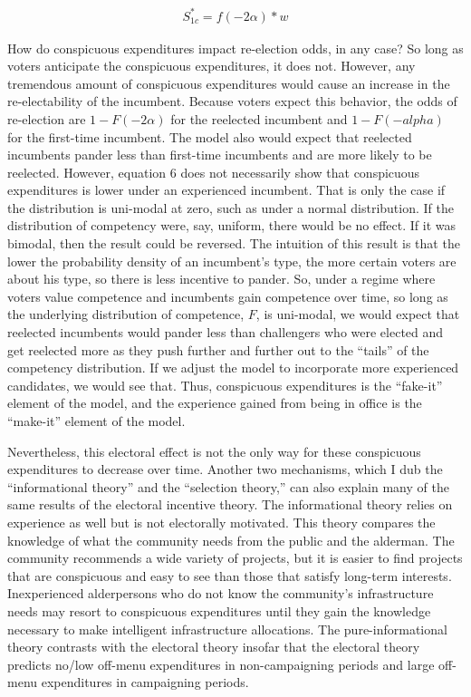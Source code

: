 \begin{align}
    S_{1c}^*=f(-2\alpha)*w
\end{align}

How do conspicuous expenditures impact re-election odds, in any case? So long as voters anticipate the conspicuous expenditures, it does not. 
However, any tremendous amount of conspicuous expenditures would cause an increase in the re-electability of the incumbent. 
Because voters expect this behavior, the odds of re-election are $1-F(-2 \alpha)$ for the reelected incumbent and $1-F(-alpha)$ for the first-time incumbent. 
The model also would expect that reelected incumbents pander less than first-time incumbents and are more likely to be reelected. 
However, equation 6 does not necessarily show that conspicuous expenditures is lower under an experienced incumbent. 
That is only the case if the distribution is uni-modal at zero, such as under a normal distribution. 
If the distribution of competency were, say, uniform, there would be no effect. 
If it was bimodal, then the result could be reversed. 
The intuition of this result is that the lower the probability density of an incumbent's type, the more certain voters are about his type, so there is less incentive to pander. 
So, under a regime where voters value competence and incumbents gain competence over time, so long as the underlying distribution of competence, $F$, is uni-modal, we would expect that reelected incumbents would pander less than challengers who were elected and get reelected more as they push further and further out to the ``tails'' of the competency distribution. 
If we adjust the model to incorporate more experienced candidates, we would see that. 
 Thus, conspicuous expenditures is the ``fake-it'' element of the model, and the experience gained from being in office is the ``make-it'' element of the model. 

Nevertheless, this electoral effect is not the only way for these conspicuous expenditures to decrease over time. 
Another two mechanisms, which I dub the ``informational theory'' and the ``selection theory,'' can also explain many of the same results of the electoral incentive theory. 
The informational theory relies on experience as well but is not electorally motivated. 
This theory compares the knowledge of what the community needs from the public and the alderman. 
The community recommends a wide variety of projects, but it is easier to find projects that are conspicuous and easy to see than those that satisfy long-term interests. 
Inexperienced alderpersons who do not know the community's infrastructure needs may resort to conspicuous expenditures until they gain the knowledge necessary to make intelligent infrastructure allocations. 
The pure-informational theory contrasts with the electoral theory insofar that the electoral theory predicts no/low off-menu expenditures in non-campaigning periods and large off-menu expenditures in campaigning periods. 

